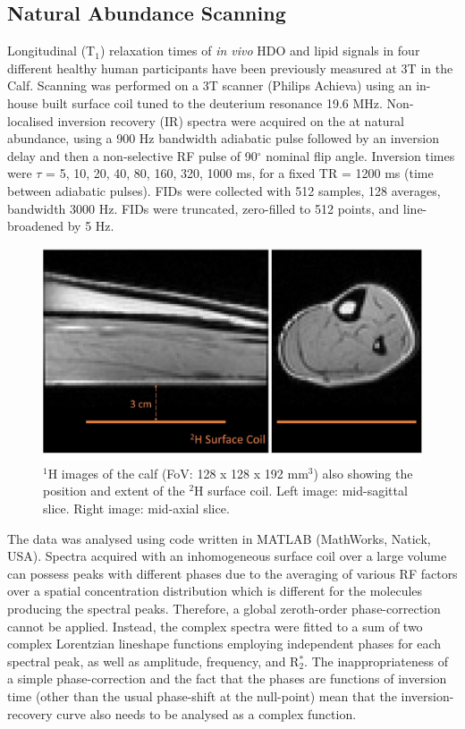 \documentclass[class=article, crop=false]{standalone}
\begin{document}
\subsection{Natural Abundance Scanning}

Longitudinal (T$_1$) relaxation times of \textit{in vivo} HDO and lipid signals in four different healthy human participants have been previously measured at 3T in the Calf\cite{Damion2021NaturalT}. Scanning was performed on a 3T scanner (Philips Achieva) using an in-house built surface coil tuned to the deuterium resonance 19.6 MHz. Non-localised inversion recovery (IR) spectra were acquired on the at natural abundance, using a 900 Hz bandwidth adiabatic pulse followed by an inversion delay and then a non-selective RF pulse of 90$^\circ$ nominal flip angle. Inversion times were $\tau$ = {5, 10, 20, 40, 80, 160, 320, 1000} ms, for a fixed TR = 1200 ms (time between adiabatic pulses). FIDs were collected with 512 samples, 128 averages, bandwidth 3000 Hz. FIDs were truncated, zero-filled to 512 points, and line-broadened by 5 Hz. %

\begin{figure}
    \centering
    \includegraphics[width=1\textwidth]{Figures/Lipid/Coil.jpg}
    \caption{$^1$H images of the calf (FoV: 128 x 128 x 192 mm$^3$) also showing the position and extent of the $^2$H surface coil. Left image: mid-sagittal slice. Right image: mid-axial slice.  }
    \label{fig:Lip:Coil}
\end{figure}

The data was analysed using code written in MATLAB (MathWorks, Natick, USA). Spectra acquired with an inhomogeneous surface coil over a large volume can possess peaks with different phases due to the averaging of various RF factors over a spatial concentration distribution which is different for the molecules producing the spectral peaks. Therefore, a global zeroth-order phase-correction cannot be applied. Instead, the complex spectra were fitted to a sum of two complex Lorentzian lineshape functions employing independent phases for each spectral peak, as well as amplitude, frequency, and R$_2^*$. The inappropriateness of a simple phase-correction and the fact that the phases are functions of inversion time (other than the usual phase-shift at the null-point) mean that the inversion-recovery curve also needs to be analysed as a complex function.
\end{document}
